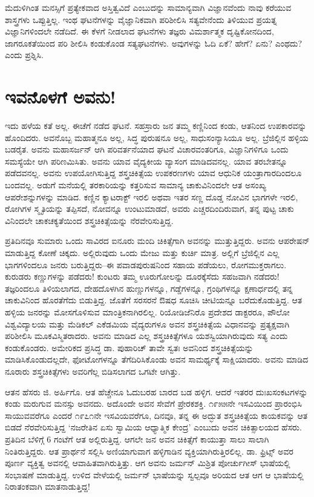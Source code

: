 ಮೆದುಳಿಗಿಂತ ಮನಸ್ಸಿಗೆ ಪ್ರತ್ಯೇಕವಾದ ಅಸ್ತಿತ್ವವಿದೆ ಎಂಬುದನ್ನು ಸಾಮಾನ್ಯವಾಗಿ ವಿಜ್ಞಾನವೆಂದು ನಾವು ಕರೆಯುವ ಶಾಸ್ತ್ರಗಳು ಒಪ್ಪುತ್ತಿಲ್ಲ. ಇಂಥ ಘಟನೆಗಳನ್ನು ವೈಜ್ಞಾನಿಕವಾಗಿ ಪರಿಶೀಲಿಸಿ ಸತ್ಯವೇನೆಂದು ತಿಳಿಯುವ ಪ್ರಯತ್ನ ವಿಜ್ಞಾನಿಗಳಿಂದಲೇ ನಡೆದಿದೆ. ಈ ಕೆಳಗೆ ನೀಡಲಾದ ಘಟನೆಗಳು ತಜ್ಞರು ವಿಮರ್ಶಾತ್ಮಕ ದೃಷ್ಟಿಕೋನದಿಂದ, ಜಾಗರೂಕತೆಯಿಂದ ಪರಿ ಶೀಲಿಸಿ ಕಂಡುಕೊಂಡ ಸತ್ಯಘಟನೆಗಳು. ಅವುಗಳನ್ನು ಓದಿ ಏಕೆ? ಹೇಗೆ? ಏನು? ಎಂಥದು? ಎಂದು ಪ್ರಶ್ನಿಸಿ.


\section{ಇವನೊಳಗೆ ಅವನು!}

ಇದು ಹಳೆಯ ಕತೆ ಅಲ್ಲ. ಈಚೆಗೆ ನಡೆದ ಘಟನೆ. ಸಹಸ್ರಾರು ಜನ ತಮ್ಮ ಕಣ್ಣಿನಿಂದ ಕಂಡು, ಆತನಿಂದ ಉಪಕಾರವನ್ನು ಹೊಂದಿದರು. ಅವನೊಬ್ಬ ಮಹಾತ್ಮನೂ ಅಲ್ಲ, ಸಿದ್ಧ ಪುರುಷನೂ ಅಲ್ಲ, ಸಾಧುಸಂನ್ಯಾಸಿಯೂ ಅಲ್ಲ. ಬ್ರೆಜಿಲ್ಲಿನ ಹಳ್ಳಿಯ ಬಡರೈತ. ಅವನು ಮಹಾಸರ್ಜನ್ ಆಗಿ ಪರಿವರ್ತನೆಯಾದ ಘಟನೆ ವಿಚಾರವಂತರಿಗೂ, ವಿಜ್ಞಾನಿಗಳಿಗೂ ಒಂದು ಸಮಸ್ಯೆಯೇ ಆಗಿ ಪರಿಣಮಿಸಿತು. ಅವನು ಯಾವ ವೈದ್ಯಕೀಯ ವ್ಯಾಸಂಗ ಮಾಡಿದವನಲ್ಲ. ಯಾವ ತರಬೇತನ್ನೂ ಪಡೆದವನಲ್ಲ. ಅವನು ಉಪಯೋಗಿಸುತ್ತಿದ್ದ ಶಸ್ತ್ರಚಿಕಿತ್ಸೆಯ ಉಪಕರಣಗಳು ಯಾವ ಆಧುನಿಕ ಯಂತ್ರಾಗಾರದಿಂದಲೂ ಬಂದವಲ್ಲ. ಅಡುಗೆ ಮನೆಯಲ್ಲಿ ತರಕಾರಿಯನ್ನು ಕತ್ತರಿಸುವ ಸಾಮಾನ್ಯ ಚಾಕುವಿನಿಂದಲೇ ಆತ ಅಸಂಖ್ಯ ಆಪರೇಶನ್ನುಗಳನ್ನು ಮಾಡಿದ. ಕಣ್ಣಿನ ಕ್ಯಾಟರಾಕ್ಟ್ ಇರಲಿ ಅಥವಾ ಇತರ ಸಣ್ಣ ದೊಡ್ಡ ನೋವಿನ ಭಾಗಗಳೇ ಇರಲಿ, ರೋಗಿಗಳ ಸ್ಮೃತಿಯನ್ನು ತಪ್ಪಿಸದೆ, ನೋವನ್ನೂ ಉಂಟುಮಾಡದೆ, ಅವರು ಎಚ್ಚರದಿಂದಿರುವಾಗ, ತನ್ನ ಪುಟ್ಟ ಚಾಕು ವಿನಿಂದಲೇ ಚಾಕಚಕ್ಯತೆಯಿಂದ ಶಸ್ತ್ರಚಿಕಿತ್ಸೆಯನ್ನು ನೆರವೇರಿಸುತ್ತಿದ್ದ.

ಪ್ರತಿದಿನವೂ ಸುಮಾರು ಒಂದು ಸಾವಿರದ ಐನೂರು ಮಂದಿ ಚಿಕಿತ್ಸೆಗಾಗಿ ಅವನನ್ನು ಮುತ್ತುತ್ತಿದ್ದರು. ಅವನು ಆಪರೇಷನ್ ಮಾಡುತ್ತಿದ್ದ ಕೋಣೆ ಚಿಕ್ಕದು. ಅಲ್ಲಿರುವುದು ಒಂದು ಮೇಜು ಮತ್ತು ಕುರ್ಚಿ ಮಾತ್ರ. ಅಲ್ಲಿಗೆ ಬ್ರೆಜಿಲ್ಲಿನ ಎಲ್ಲ ಭಾಗಗಳಿಂದಲೂ ಜನರು ಬರುತ್ತಿದ್ದರು–ಈ ಪವಾಡಪುರುಷನಿಂದ ಸಹಾಯ ಪಡೆಯಲು, ರೋಗಮುಕ್ತರಾಗಲು. ಕುರುಡರು ಕಣ್ಣುಗಳನ್ನು ಪಡೆದರು! ಕುಂಟರು ತಮ್ಮ ಊರುಗೋಲನ್ನು ದೂರಕ್ಕೆಸೆದು ಸಹಜವಾಗಿ ನಡೆದರು! ತಜ್ಞರಿಂದಲೂ ತಿಳಿಯಲಾಗದ, ದೇಹದೊಳಗಿನ ಹುಣ್ಣುಗಳನ್ನೂ, ಗಡ್ಡೆಗಳನ್ನೂ, ಗ್ರಂಥಿಗಳನ್ನೂ ಕ್ಷಣಾರ್ಧದಲ್ಲಿ ತನ್ನ ಚಾಕುವಿನಿಂದ ಹೊರತೆಗೆದು ಬಿಡುತ್ತಿದ್ದ. ಜೊತೆಗೆ ಸರಸರನೆ ಔಷಧ ಸೂಚಿಸಿ ಚೀಟಿಯನ್ನೂ ಬರೆದುಕೊಡುತ್ತಿದ್ದ. ಆತ ಹಳ್ಳಿಯ ಜನರನ್ನು ಮೋಸಗೊಳಿಸುವ ಮಾಂತ್ರಿಕನಾಗಿರಲಿಲ್ಲ. ರಿಯೋಡಿಜೆನಿರೊ ಪ್ರದೇಶದ ಡಾಕ್ಟರರೂ, ಪೌಲೋ ವಿಶ್ವವಿದ್ಯಾಲಯ ಮತ್ತು ಮೆಡಿಕಲ್ ಎಕೆಡಮಿಯ ವೈದ್ಯರುಗಳೂ ಅವನ ಶಸ್ತ್ರಚಿಕಿತ್ಸೆಯ ವಿಧಾನವನ್ನು ಪ್ರತ್ಯಕ್ಷವಾಗಿ ಪರಿಶೀಲಿಸಿ ಮೂಕವಿಸ್ಮಿತರಾದರು. ಅವನು ಮಾಡಿದ ಎಲ್ಲ ಶಸ್ತ್ರಚಿಕಿತ್ಸೆಗಳೂ ಯಶಸ್ವಿಯಾಗಿರುವುದು ಸತ್ಯ ಎಂದು ಕಂಡುಕೊಂಡರು. ಅಮೇರಿಕದ ಪ್ರಸಿದ್ಧ ಡಾ. ಪುಹಾರಿಚ್ ತಾವೇ ಸ್ವತಃ ಅವನಿಂದ ಶಸ್ತ್ರಚಿಕಿತ್ಸೆಯನ್ನು ಮಾಡಿಸಿಕೊಂಡುದಲ್ಲದೇ, ಫೋಟೋಗಳನ್ನೂ ತೆಗೆದಿರಿಸಿಕೊಂಡು ಅವನ ಸಾಮರ್ಥ್ಯಕ್ಕೆ ಸಾಕ್ಷಿಯಾದರು. ಅವನು ಮಾಡಿದ ನೂರಾರು ಶಸ್ತ್ರಚಿಕಿತ್ಸೆಗಳು ಅವರಿಗೆಲ್ಲ ಬಿಡಿಸಲಾಗದ ಒಗಟೇ ಆಗಿತ್ತು.

ಆತನ ಹೆಸರು ಜಿ. ಅರ್ಹಿಗೊ. ಆತ ಹೆಚ್ಚೇನೂ ಓದುಬರಹ ಬಾರದ ಬಡ ಹಳ್ಳಿಗ. ಆದರೆ ಇತರರ ದುಃಖಸಂಕಟಗಳನ್ನು ಕಂಡು ಮರುಗುವ ಮನಸ್ಸು ಅವನದು. ಅದೊಂದೇ ಅವನ ಸೇವೆಗೆ ಪ್ರೇರಕಶಕ್ತಿ. ೧೯೫೫ನೇ ಇಸವಿಯಿಂದ ಪ್ರಾರಂಭಿಸಿ ಸಾಯುವವರೆಗೂ ಎಂದರೆ ೧೯೭೧ನೇ ಇಸವಿಯವರೆಗೂ, ದಿನವೂ, ತನ್ನ ಈ ಅದ್ಭುತ ಶಸ್ತ್ರಚಿಕಿತ್ಸೆಯ ಕಾಯಕವನ್ನು ಆತ ಬಿಡದೆ ನೆರವೇರಿಸುತ್ತಿದ್ದ ‘ನಜರೇತಿನ ಏಸು ಸ್ವಾಮಿಯ ಆಧ್ಯಾತ್ಮಿಕ ಕೇಂದ್ರ’ ಎಂಬುದು ಅವನ ಚಿಕಿತ್ಸಾಲಯದ ಹೆಸರು. ಪ್ರತಿದಿನ ಬೆಳಿಗ್ಗೆ 6 ಗಂಟೆಗೆ ಆತ ಅಲ್ಲಿರುತ್ತಿದ್ದ. ಆಗಲೇ ಜನ ಅವನ ಚಿಕಿತ್ಸೆಗೆ ಕಾಯುತ್ತಾ ಸಾಲು ಸಾಲಾಗಿ ನಿಂತಿರುತ್ತಿದ್ದರು. ಆತ ಪ್ರಾರ್ಥನೆ ಸಲ್ಲಿಸಿ ಅಣಿಯಾಗುವಾಗ ಹಳ್ಳಿಗಾಡಿನ ವ್ಯಕ್ತಿಯಾಗಿರುತ್ತಿರಲಿಲ್ಲ. ಡಾ. ಫ್ರಿಟ್ಸ್ ಅವರ ಪೂರ್ಣ ವ್ಯಕ್ತಿತ್ವ ಅವನಲ್ಲಿ ಆವಾಹಿತವಾಗಿರುತ್ತಿತ್ತು. ಆಗ ಅವನು ಜರ್ಮನ್ ಮಿಶ್ರಿತ ಪೋರ್ಚುಗೀಸ್ ಭಾಷೆಯಲ್ಲಿ ಸಂಭಾಷಣೆ ಮಾಡುತ್ತಿದ್ದ. ಉಳಿದ ವೇಳೆಯಲ್ಲಿ ಜರ್ಮನ್ ಭಾಷೆಯನ್ನು ಸ್ವಲ್ಪವೂ ಅರಿಯದ ಆತ ಆಗ ಆ ಭಾಷೆಯಲ್ಲಿ ನಿರಾತಂಕವಾಗಿ ಮಾತನಾಡುತ್ತಿದ್ದ!

